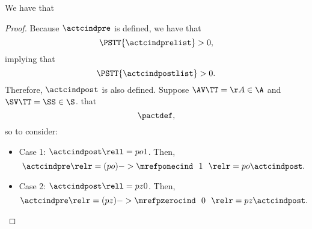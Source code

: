 \begin{proposition}
  We have that %
\end{proposition}

\begin{proof}
  Because $\actcindpre$ is defined,
  we have that 
  $$\PSTT{\actcindprelist} > 0,$$ 
  implying that
  $$\PSTT{\actcindpostlist} > 0.$$
  Therefore,
  $\actcindpost$ is also defined.
  Suppose 
  $\AV\TT = \AA \in \A$
  and
  $\SV\TT = \SS \in \S$.
   that 
  $$\pactdef,$$
  so  to consider:
  \begin{itemize}
    \item Case 1: $\actcindpost \rell = po 1$.
      Then,
      $$\actcindpre \relr = (po)->{\mrefponecind} \ \ 1\ \ \relr = po \actcindpost.$$
    \item Case 2: $\actcindpost \rell = pz 0$.
      Then,
      $$\actcindpre \relr = (pz)->{\mrefpzerocind} \ \ 0\ \ \relr = pz \actcindpost.$$
  \end{itemize}
\end{proof}
